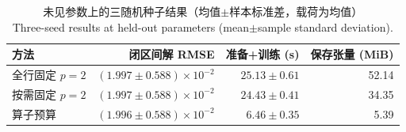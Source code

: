 \begin{table}[H]
\centering
\caption{未见参数上的三随机种子结果（均值$\pm$样本标准差，载荷为均值）\\Three-seed results at held-out parameters (mean$\pm$sample standard deviation).}
\label{tab:parameterized}
\small
\begin{tabular}{lrrr}
\toprule
方法 & 闭区间解 RMSE & 准备+训练 (s) & 保存张量 (MiB) \\
\midrule
全行固定 $p=2$ & $(1.997\pm0.588)\times10^{-2}$ & $25.13\pm0.61$ & 52.14 \\
按需固定 $p=2$ & $(1.997\pm0.588)\times10^{-2}$ & $24.43\pm0.41$ & 34.35 \\
算子预算 & $(1.996\pm0.588)\times10^{-2}$ & $6.46\pm0.35$ & 5.39 \\
\bottomrule
\end{tabular}
\end{table}
